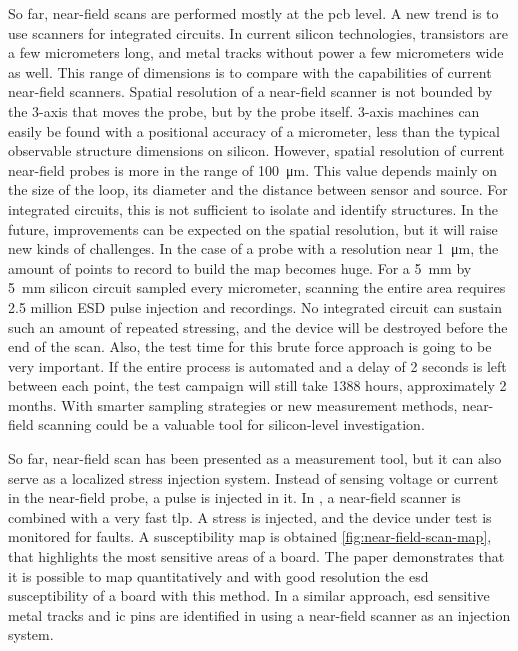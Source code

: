 So far, near-field scans are performed mostly at the \gls{pcb} level.
A new trend is to use scanners for integrated circuits.
In current silicon technologies, transistors are a few micrometers long, and metal tracks without power a few micrometers wide as well.
This range of dimensions is to compare with the capabilities of current near-field scanners.
Spatial resolution of a near-field scanner is not bounded by the 3-axis that moves the probe, but by the probe itself.
3-axis machines can easily be found with a positional accuracy of a micrometer, less than the typical observable structure dimensions on silicon.
However, spatial resolution of current near-field probes is more in the range of \SI{100}{\micro\metre}.
This value depends mainly on the size of the loop, its diameter and the distance between sensor and source.
For integrated circuits, this is not sufficient to isolate and identify structures.
In the future, improvements can be expected on the spatial resolution, but it will raise new kinds of challenges.
In the case of a probe with a resolution near \SI{1}{\micro\metre}, the amount of points to record to build the map becomes huge.
For a \SI{5}{\milli\metre} by \SI{5}{\milli\metre} silicon circuit sampled every micrometer, scanning the entire area requires 2.5 million ESD pulse injection and recordings.
No integrated circuit can sustain such an amount of repeated stressing, and the device will be destroyed before the end of the scan.
Also, the test time for this brute force approach is going to be very important.
If the entire process is automated and a delay of 2 seconds is left between each point, the test campaign will still take 1388 hours, approximately 2 months.
With smarter sampling strategies or new measurement methods, near-field scanning could be a valuable tool for silicon-level investigation.

So far, near-field scan has been presented as a measurement tool, but it can also serve as a localized stress injection system.
Instead of sensing voltage or current in the near-field probe, a pulse is injected in it.
In \cite{NearFieldInjectionFabrice}, a near-field scanner is combined with a very fast \gls{tlp}.
A stress is injected, and the device under test is monitored for faults.
A susceptibility map is obtained \ref{fig:near-field-scan-map}, that highlights the most sensitive areas of a board.
The paper demonstrates that it is possible to map quantitatively and with good resolution the \gls{esd} susceptibility of a board with this method.
In a similar approach, \gls{esd} sensitive metal tracks and \gls{ic} pins are identified in \cite{NearFieldInjectionBis} using a near-field scanner as an injection system.


